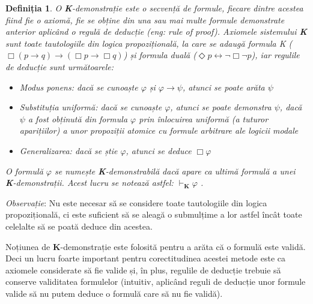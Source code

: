 \documentclass[12pt, openany]{book}
\newtheorem{definition}{Definiția}[chapter] %
\newcommand{\myenglishterm}[1]{(\textit{eng: #1})}
\begin{document}
            \begin{definition}
                O \textbf{K}-demonstrație este o secvență de formule, fiecare dintre acestea fiind fie o axiomă, fie 
                se obține din una sau mai multe formule demonstrate anterior aplicând o regulă de deducție 
                \myenglishterm{rule of proof}. Axiomele sistemului \textbf{K} sunt toate tautologiile din logica 
                propozițională, la care se adaugă formula K ($\Box (p \rightarrow q) \rightarrow (\Box p \rightarrow \Box
                q)$) și formula duală ($\Diamond p \leftrightarrow \neg \Box \neg p$), iar regulile de deducție sunt 
                următoarele:
                \begin{itemize}
                    \item \textit{Modus ponens}: dacă se cunoaște $\varphi$ și $\varphi \rightarrow \psi$, atunci se 
                    poate arăta $\psi$
                    \item \textit{Substituția uniformă}: dacă se cunoaște $\varphi$, atunci se poate demonstra $\psi$, 
                    dacă $\psi$ a fost obținută din formula $\varphi$ prin înlocuirea uniformă (a tuturor aparițiilor) a
                    unor propoziții atomice cu formule arbitrare ale logicii modale
                    \item \textit{Generalizarea}: dacă se știe $\varphi$, atunci se deduce $\Box \varphi$               
                \end{itemize}
                O formulă $\varphi$ se numește \textbf{K}-demonstrabilă dacă apare ca ultimă formulă a unei 
                \textbf{K}-demonstrații. Acest lucru se notează astfel: $\vdash_\textbf{K} \varphi$ .
            \end{definition}
            
            \par{}
                \noindent \textit{Observație}: Nu este necesar să se considere toate tautologiile din logica propozițională,
                ci este suficient să se aleagă o submulțime a lor astfel încât toate celelalte să se poată deduce 
                din acestea.

            \par{}
                Noțiunea de \textbf{K}-demonstrație este folosită pentru a arăta că o formulă este validă. Deci un lucru 
                foarte important pentru corectitudinea acestei metode este ca axiomele considerate să fie valide și, în 
                plus, regulile de deducție trebuie să conserve validitatea formulelor (intuitiv, aplicând reguli de deducție 
                unor formule valide să nu putem deduce o formulă care să nu fie validă). 
            
\end{document}
